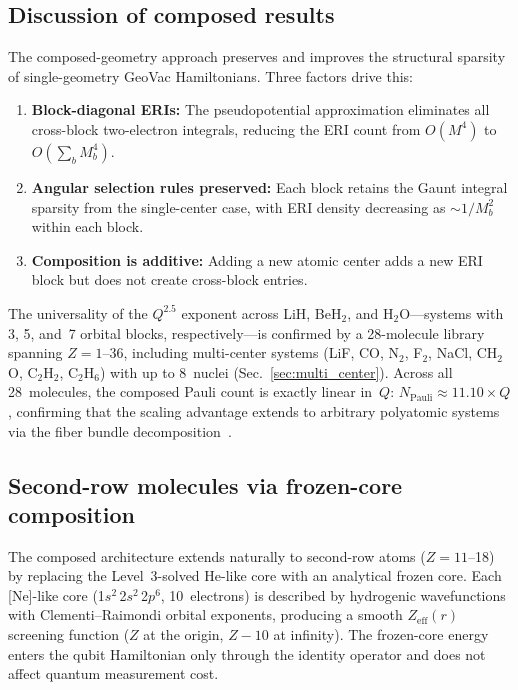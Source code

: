\documentclass[aps,pra,twocolumn,superscriptaddress,longbibliography]{revtex4-2}
\begin{document}
\subsection{Discussion of composed results}
\label{sec:composed_discussion}

The composed-geometry approach preserves and improves the structural
sparsity of single-geometry GeoVac Hamiltonians.  Three factors drive
this:
\begin{enumerate}
\item \textbf{Block-diagonal ERIs:} The pseudopotential approximation
  eliminates all cross-block two-electron integrals, reducing the
  ERI count from $O(M^4)$ to $O(\sum_b M_b^4)$.
\item \textbf{Angular selection rules preserved:} Each block retains
  the Gaunt integral sparsity from the single-center case, with ERI
  density decreasing as $\sim 1/M_b^2$ within each block.
\item \textbf{Composition is additive:} Adding a new atomic center
  adds a new ERI block but does not create cross-block entries.
\end{enumerate}
The universality of the $Q^{2.5}$ exponent across LiH, BeH$_2$, and
H$_2$O---systems with 3, 5, and~7 orbital blocks,
respectively---is confirmed by a 28-molecule library spanning
$Z = 1$--36, including multi-center systems (LiF, CO, N$_2$, F$_2$,
NaCl, CH$_2$O, C$_2$H$_2$, C$_2$H$_6$) with up to 8~nuclei
(Sec.~\ref{sec:multi_center}).  Across all 28~molecules, the composed
Pauli count is exactly linear in~$Q$: $N_{\mathrm{Pauli}} \approx
11.10 \times Q$, confirming that the scaling advantage extends
to arbitrary polyatomic systems via the fiber bundle
decomposition~\cite{loutey_paper17}.


\subsection{Second-row molecules via frozen-core composition}
\label{sec:second_row}

The composed architecture extends naturally to second-row atoms
($Z = 11$--18) by replacing the Level~3-solved He-like core
with an analytical frozen core.  Each [Ne]-like core
(1$s^2$\,2$s^2$\,2$p^6$, 10~electrons) is described by hydrogenic
wavefunctions with Clementi--Raimondi orbital exponents, producing
a smooth $Z_{\text{eff}}(r)$ screening function ($Z$ at the origin,
$Z-10$ at infinity).  The frozen-core energy enters the qubit
Hamiltonian only through the identity operator and does not affect
quantum measurement cost.
\end{document}
